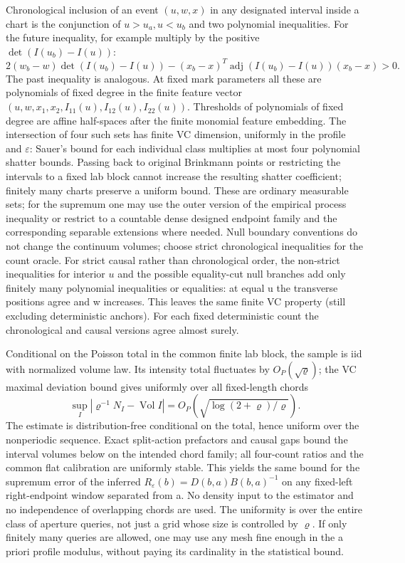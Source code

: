 \documentclass[11pt]{article}
\begin{document}
Chronological inclusion of an event \((u,w,x)\) in any designated interval inside a chart is the conjunction of \(u>u_a,u<u_b\) and two polynomial inequalities. For the future inequality, for example multiply by the positive \(\det(I(u_b)-I(u))\):
\[
2(w_b-w)\det(I(u_b)-I(u))
 -(x_b-x)^T\operatorname{adj}(I(u_b)-I(u))(x_b-x)>0.
\]
The past inequality is analogous. At fixed mark parameters all these are polynomials of fixed degree in the finite feature vector \((u,w,x_1,x_2,I_{11}(u),I_{12}(u),I_{22}(u))\). Thresholds of polynomials of fixed degree are affine half-spaces after the finite monomial feature embedding. The intersection of four such sets has finite VC dimension, uniformly in the profile and \(\varepsilon\): Sauer's bound \cite{sauer} for each individual class multiplies at most four polynomial shatter bounds. Passing back to original Brinkmann points or restricting the intervals to a fixed lab block cannot increase the resulting shatter coefficient; finitely many charts preserve a uniform bound. These are ordinary measurable sets; for the supremum one may use the outer version of the empirical process inequality or restrict to a countable dense designed endpoint family and the corresponding separable extensions where needed. Null boundary conventions do not change the continuum volumes; choose strict chronological inequalities for the count oracle. For strict causal rather than chronological order, the non-strict inequalities for interior \(u\) and the possible equality-cut null branches add only finitely many polynomial inequalities or equalities: at equal u the transverse positions agree and w increases. This leaves the same finite VC property (still excluding deterministic anchors). For each fixed deterministic count the chronological and causal versions agree almost surely.

Conditional on the Poisson total in the common finite lab block, the sample is iid with normalized volume law. Its intensity total fluctuates by \(O_P(\sqrt\varrho)\); the VC maximal deviation bound \cite{vc} gives uniformly over all fixed-length chords
\[
\sup_I\left|\varrho^{-1}N_I-\operatorname{Vol}I\right|
       =O_P(\sqrt{\log(2+\varrho)/\varrho}).
\]
The estimate is distribution-free conditional on the total, hence uniform over the nonperiodic sequence. Exact split-action prefactors and causal gaps bound the interval volumes below on the intended chord family; all four-count ratios and the common flat calibration are uniformly stable. This yields the same bound for the supremum error of the inferred \(R_\varepsilon(b)=D(b,a)B(b,a)^{-1}\) on any fixed-left right-endpoint window separated from a. No density input to the estimator and no independence of overlapping chords are used. The uniformity is over the entire class of aperture queries, not just a grid whose size is controlled by \(\varrho\). If only finitely many queries are allowed, one may use any mesh fine enough in the a priori profile modulus, without paying its cardinality in the statistical bound.
\end{document}
